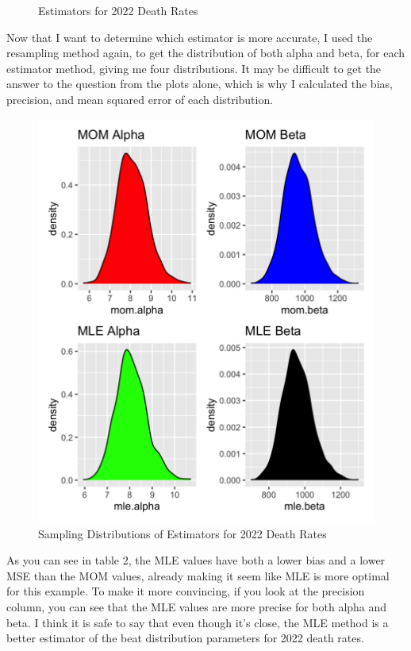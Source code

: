 \documentclass{article}\usepackage[]{graphicx}\usepackage[]{xcolor}
\begin{document}
\begin{multicols}{2}
\begin{figure}[H]
  \caption{Estimators for 2022 Death Rates}
  \label{fig:estimators}
\end{figure}
Now that I want to determine which estimator is more accurate, I used the resampling method again, to get the distribution of both alpha and beta, for each estimator method, giving me four distributions. It may be difficult to get the answer to the question from the plots alone, which is why I calculated the bias, precision, and mean squared error of each distribution. 
\begin{figure}[H]
  \centering
  \includegraphics[width=0.7\linewidth]{bestestimator.png}
  \caption{Sampling Distributions of Estimators for 2022 Death Rates}
  \label{fig:sampling.estimators}
\end{figure}

\begin{table}[H]
\centering
{}
\caption{Numerical summaries of estimator distributions} 
\label{estimators.summary:reference}
\end{table}
As you can see in table 2, the MLE values have both a lower bias and a lower MSE than the MOM values, already making it seem like MLE is more optimal for this example. To make it more convincing, if you look at the precision column, you can see that the MLE values are more precise for both alpha and beta. I think it is safe to say that even though it's close, the MLE method is a better estimator of the beat distribution parameters for 2022 death rates.

\end{multicols}
\end{document}
